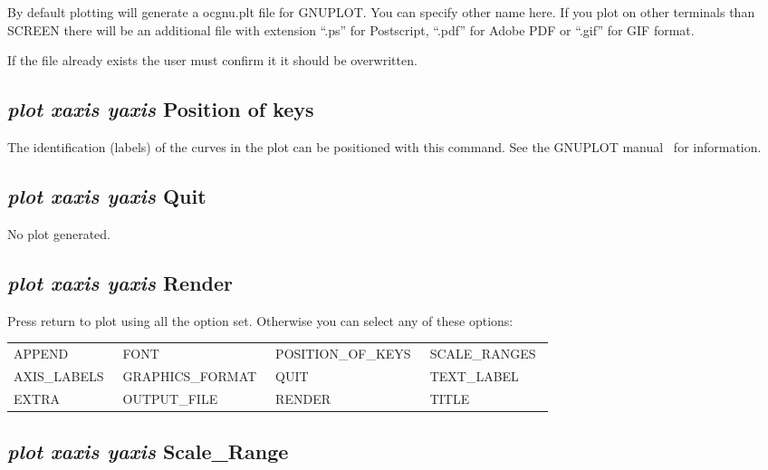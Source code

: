 \documentclass[11pt]{article}
\begin{document}
By default plotting will generate a ocgnu.plt file for GNUPLOT.  You
can specify other name here.  If you plot on other terminals than
SCREEN there will be an additional file with extension ``.ps'' for
Postscript, ``.pdf'' for Adobe PDF or ``.gif'' for GIF format.

If the file already exists the user must confirm it it should be
overwritten.

\hypertarget{Plot keys}{}
\subsection{{\em plot xaxis yaxis} Position of keys}

The identification (labels) of the curves in the plot can be
positioned with this command.  See the GNUPLOT manual~\cite{gnuplot}
for information.

\hypertarget{Plot quit}{}
\subsection{{\em plot xaxis yaxis} Quit}

No plot generated.

\hypertarget{Plot render}{}
\hypertarget{Render}{}
\subsection{{\em plot xaxis yaxis} Render}

Press return to plot using all the option set.  Otherwise you
can select any of these options:

{\small
\begin{tabular}{llll}
 APPEND        & FONT              & POSITION\_OF\_KEYS~ & SCALE\_RANGES~ \\
 AXIS\_LABELS~ & GRAPHICS\_FORMAT~ & QUIT                & TEXT\_LABEL \\
 EXTRA         & OUTPUT\_FILE      & RENDER              & TITLE\\  
\end{tabular}
}

\hypertarget{Plot limits}{}
\subsection{{\em plot xaxis yaxis} Scale\_Range}
\end{document}
